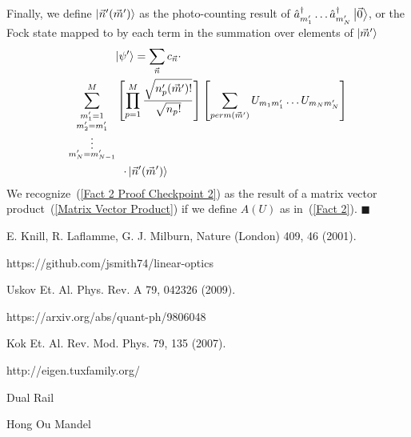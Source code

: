 \documentclass[aps,pra,twocolumn,showpacs,superscriptaddress,floatfix,10pt]{revtex4}
\begin{document}
Finally, we define $\ket{\vec{n}^\prime(\vec{m}^\prime)}$ as the photo-counting result of $\hat{a}_{m_1^\prime}^\dagger \dots \hat{a}_{m_N^\prime}^\dagger \ket{\vec{0}}$, or the Fock state mapped to by each term in the summation over elements of $\ket{\vec{m}^\prime}$
\begin{eqnarray}
\label{Fact 2 Proof Checkpoint 2}
\small \ket{\psi^\prime} = \sum_{\vec{n}} c_{\vec{n}}  \cdot \quad \quad \quad \quad \quad \quad \quad \quad \quad \quad \quad \quad \quad \quad \quad \quad  \\ \sum^M_{\substack{m_1^\prime = 1\\
		m_2^\prime = m_1^\prime\\
		\vdots \\
		m_N^\prime = m_{N-1}^\prime}}
\left[ \prod_{p=1}^{M} \frac{\sqrt{n_p^\prime(\vec{m}^\prime) !}}{ \sqrt{n_p !}} \right] \left[ \sum_{perm(\vec{m}^\prime)} U_{m_1 m_1^\prime} \dots U_{m_N m_N^\prime} \right] \nonumber \\
\cdot \ket{\vec{n}^\prime (\vec{m}^\prime) } \quad \quad \quad \quad \quad \quad \quad \quad \quad \quad \quad \quad \quad \quad \quad \quad \nonumber
\end{eqnarray}
We recognize~(\ref{Fact 2 Proof Checkpoint 2}) as the result of a matrix vector product~(\ref{Matrix Vector Product}) if we define $A(U)$ as in~(\ref{Fact 2}).  $ \blacksquare $

\begin{thebibliography}{99}

  E. Knill, R. Laflamme, G. J. Milburn, Nature (London) 409, 46 (2001).

 https://github.com/jsmith74/linear-optics

 Uskov Et. Al.
Phys. Rev. A 79, 042326 (2009).

 https://arxiv.org/abs/quant-ph/9806048

 Kok Et. Al.
Rev. Mod. Phys. 79, 135 (2007).

 http://eigen.tuxfamily.org/

 Dual Rail

 Hong Ou Mandel

\end{thebibliography}
\end{document}
